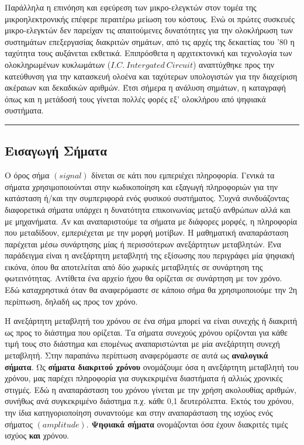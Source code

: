 \documentclass[breaklines=true, 12pt]{article}
\begin{document}
Παράλληλα η επινόηση και εφεύρεση των μικρο-ελεγκτών στον τομέα της
μικροηλεκτρονικής επέφερε περαιτέρω μείωση του κόστους. Ενώ οι
πρώτες συσκευές μικρο-ελεγκτών δεν παρείχαν τις απαιτούμενες δυνατότητες
για την ολοκλήρωση των συστημάτων επεξεργασίας διακριτών σημάτων, από
τις αρχές της δεκαετίας του '80 η ταχύτητα τους αυξάνεται εκθετικά.
Επιπρόσθετα η αρχιτεκτονική και τεχνολογία των ολοκληρωμένων κυκλωμάτων
(\({I.C.\ Intergated\ Circuit}\)) αναπτύχθηκε προς την κατεύθυνση για την κατασκευή
ολοένα και ταχύτερων υπολογιστών για την διαχείριση ακέραιων και δεκαδικών
αριθμών. Έτσι σήμερα η ανάλυση σημάτων, η καταγραφή όπως και η μετάδοσή τους
γίνεται πολλές φορές εξ' ολοκλήρου από ψηφιακά συστήματα.

\noindent\rule{\textwidth}{0.5pt}
\subsection{Εισαγωγή Σήματα}
\label{sec:orgc5d4d51}
Ο όρος σήμα \({(signal)}\) δίνεται σε κάτι που εμπεριέχει πληροφορία. Γενικά
τα σήματα χρησιμοποιούνται στην κωδικοποίηση και εξαγωγή πληροφοριών για
την κατάσταση ή/και την συμπεριφορά ενός φυσικού συστήματος. Συχνά
συνδυάζοντας διαφορετικά σήματα υπάρχει η δυνατότητα επικοινωνίας μεταξύ
ανθρώπων αλλά και με μηχανήματα. Άν και αναπαριστούμε τα σήματα με διάφορες
μορφές, η πληροφορία που μεταδίδουν, εμπεριέχεται με την μορφή μοτίβων. Η
μαθηματική αναπαράσταση παρέχεται μέσω συνάρτησης μίας ή περισσότερων
ανεξάρτητων μεταβλητών. Ένα παράδειγμα είναι η ανεξάρτητη μεταβλητή της
εξίσωσης που περιγράφει μία ψηφιακή εικόνα, όπου θα αποτελείται από δύο
χωρικές μεταβλητές σε συνάρτηση της φωτεινότητας. Αντίθετα ένα αρχείο ήχου
θα ορίζεται σε συνάρτηση με τον χρόνο. Εδώ καταχρηστικά όταν θα αναφερόμαστε
σε κάποιο σήμα θα χρησιμοποιούμε την 2η περίπτωση, δηλαδή ως προς τον χρόνο.

Η ανεξάρτητη μεταβλητή του χρόνου σε ένα σήμα μπορεί να είναι συνεχής ή
διακριτή ως προς το διάστημα που ορίζεται. Τα σήματα συνεχούς χρόνου
ορίζονται για κάθε τιμή τους στο διάστημα και επομένως αναπαριστώνται
με μία ανεξάρτητη συνεχή μεταβλητή. Στην παραπάνω περίπτωση αναφερόμαστε
σε αυτά ως \textbf{αναλογικά σήματα}. Ως \textbf{σήματα διακριτού χρόνου} ονομάζουμε όσα η
ανεξάρτητη μεταβλητή του χρόνου, μας παρέχει πληροφορία για συγκεκριμένα
διαστήματα ή αλλιώς χρονικές στιγμές. Εδώ η αναπαράσταση του χρόνου γίνεται
με την χρήση ακολουθίας αριθμών, συνήθως ανά συγκεκριμένο διάστημα π.χ.
κάθε 0,1 δευτερόλεπτα. Εκτός του χρόνου, την ίδια κατηγοριοποίηση συναντούμε
και στην αναπαράσταση της ισχύος ενός σήματος \((amplitude)\). \textbf{Ψηφιακά σήματα}
ονομάζονται όσα έχουν διακριτές τιμές ισχύος \textbf{και} χρόνου.
\end{document}
